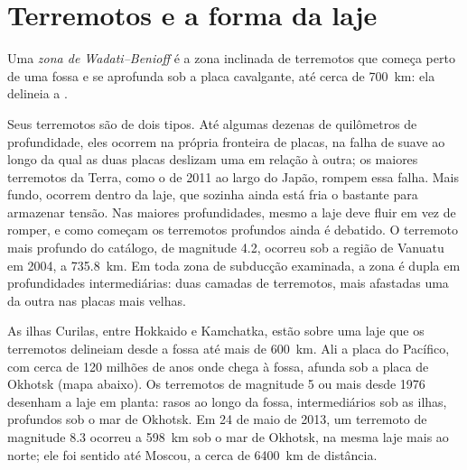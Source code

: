 \section{Terremotos e a forma da laje}\label{sec:b1:active-margins:seismicity}

\begin{definition}\label{def:b1:active-margins:wadati-benioff}
Uma \emph{zona de Wadati--Benioff} é a zona inclinada de terremotos que começa perto de uma fossa e se aprofunda sob a placa cavalgante, até cerca de \qty{700}{km}: ela delineia a .
\end{definition}

Seus terremotos são de dois tipos. Até algumas dezenas de quilômetros de profundidade, eles ocorrem na própria fronteira de placas, na falha de  suave ao longo da qual as duas placas deslizam uma em relação à outra; os maiores terremotos da Terra, como o de 2011 ao largo do Japão, rompem essa falha. Mais fundo, ocorrem dentro da laje, que sozinha ainda está fria o bastante para armazenar tensão. Nas maiores profundidades, mesmo a laje deve fluir em vez de romper, e como começam os terremotos profundos ainda é debatido. O terremoto mais profundo do catálogo, de magnitude 4.2, ocorreu sob a região de Vanuatu em 2004, a \qty{735.8}{km}. Em toda zona de subducção examinada, a zona é dupla em profundidades intermediárias: duas camadas de terremotos, mais afastadas uma da outra nas placas mais velhas.

As ilhas Curilas, entre Hokkaido e Kamchatka, estão sobre uma laje que os terremotos delineiam desde a fossa até mais de \qty{600}{km}. Ali a placa do Pacífico, com cerca de 120 milhões de anos onde chega à fossa, afunda sob a placa de Okhotsk (mapa abaixo). Os terremotos de magnitude 5 ou mais desde 1976 desenham a laje em planta: rasos ao longo da fossa, intermediários sob as ilhas, profundos sob o mar de Okhotsk. Em 24 de maio de 2013, um terremoto de magnitude 8.3 ocorreu a \qty{598}{km} sob o mar de Okhotsk, na mesma laje mais ao norte; ele foi sentido até Moscou, a cerca de \qty{6400}{km} de distância.

